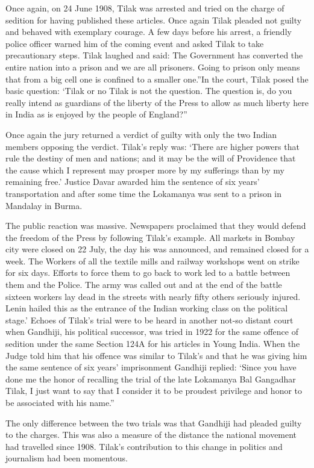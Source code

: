 Once again, on 24 June 1908, Tilak was arrested and tried on the charge of sedition for having published these articles. Once again Tilak pleaded not guilty and behaved with exemplary courage. A few days before his arrest, a friendly police officer warned him of the coming event and asked Tilak to take precautionary steps. Tilak laughed and said: The Government has converted the entire nation into a prison and we are all prisoners. Going to prison only means that from a big cell one is confined to a smaller one.”In the court, Tilak posed the basic question: ‘Tilak or no Tilak is not the question. The question is, do you really intend as guardians of the liberty of the Press to allow as much liberty here in India as is enjoyed by the people of England?”

Once again the jury returned a verdict of guilty with only the two Indian members opposing the verdict. Tilak’s reply was: ‘There are higher powers that rule the destiny of men and nations; and it may be the will of Providence that the cause which I represent may prosper more by my sufferings than by my remaining free.’ Justice Davar awarded him the sentence of six years’ transportation and after some time the Lokamanya was sent to a prison in Mandalay in Burma.

The public reaction was massive. Newspapers proclaimed that they would defend the freedom of the Press by following Tilak’s example. All markets in Bombay city were closed on 22 July, the day his was announced, and remained closed for a week. The Workers of all the textile mills and railway workshops went on strike for six days. Efforts to force them to go back to work led to a battle between them and the Police. The army was called out and at the end of the battle sixteen workers lay dead in the streets with nearly fifty others seriously injured. Lenin hailed this as the entrance of the Indian working class on the political stage.’ Echoes of Tilak’s trial were to be heard in another not-so­ distant court when Gandhiji, his political successor, was tried in 1922 for the same offence of sedition under the same Section 124A for his articles in Young India. When the Judge told him that his offence was similar to Tilak’s and that he was giving him the same sentence of six years’ imprisonment Gandhiji replied: ‘Since you have done me the honor of recalling the trial of the late Lokamanya Bal Gangadhar Tilak, I just want to say that I consider it to be proudest privilege and honor to be associated with his name.”

The only difference between the two trials was that Gandhiji had pleaded guilty to the charges. This was also a measure of the distance the national movement had travelled since 1908. Tilak’s contribution to this change in politics and journalism had been momentous.
